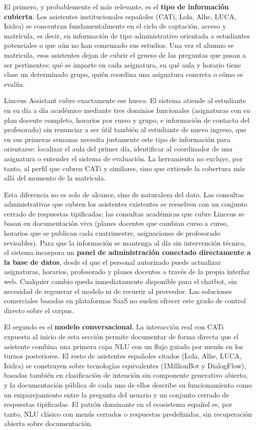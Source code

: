 El primero, y probablemente el más relevante, es el \textbf{tipo de información cubierta}. Los asistentes institucionales españoles (CATi, Lola, Alhe, LUCA, Isidra) se concentran fundamentalmente en el ciclo de captación, acceso y matrícula, es decir, en información de tipo administrativo orientada a estudiantes potenciales o que aún no han comenzado sus estudios. Una vez el alumno se matricula, esos asistentes dejan de cubrir el grueso de las preguntas que pasan a ser pertinentes: qué se imparte en cada asignatura, en qué aula y horario tiene clase un determinado grupo, quién coordina una asignatura concreta o cómo se evalúa.

Linceus Assistant cubre exactamente ese hueco. El sistema atiende al estudiante en su día a día académico mediante tres dominios funcionales (asignaturas con su plan docente completo, horarios por curso y grupo, e información de contacto del profesorado) sin renunciar a ser útil también al estudiante de nuevo ingreso, que en sus primeras semanas necesita justamente este tipo de información para orientarse: localizar el aula del primer día, identificar al coordinador de una asignatura o entender el sistema de evaluación. La herramienta no excluye, por tanto, al perfil que cubren CATi y similares, sino que extiende la cobertura más allá del momento de la matrícula.

Esta diferencia no es solo de alcance, sino de naturaleza del dato. Las consultas administrativas que cubren los asistentes existentes se resuelven con un conjunto cerrado de respuestas tipificadas; las consultas académicas que cubre Linceus se basan en documentación viva (planes docentes que cambian curso a curso, horarios que se publican cada cuatrimestre, asignaciones de profesorado revisables). Para que la información se mantenga al día sin intervención técnica, el sistema incorpora un \textbf{panel de administración conectado directamente a la base de datos}, desde el que el personal autorizado puede actualizar asignaturas, horarios, profesorado y planes docentes a través de la propia interfaz web. Cualquier cambio queda inmediatamente disponible para el chatbot, sin necesidad de regenerar el modelo ni de recurrir al proveedor. Las soluciones comerciales basadas en plataformas SaaS no suelen ofrecer este grado de control directo sobre el corpus.

El segundo es el \textbf{modelo conversacional}. La interacción real con CATi expuesta al inicio de esta sección permite documentar de forma directa que el asistente combina una primera capa NLU con un flujo guiado por menús en los turnos posteriores. El resto de asistentes españoles citados (Lola, Alhe, LUCA, Isidra) se construyen sobre tecnologías equivalentes (1MillionBot y DialogFlow), basadas también en clasificación de intención sin componente generativo abierto, y la documentación pública de cada uno de ellos describe su funcionamiento como un emparejamiento entre la pregunta del usuario y un conjunto cerrado de respuestas tipificadas. El patrón dominante en el ecosistema español es, por tanto, NLU clásico con menús cerrados o respuestas predefinidas, sin recuperación abierta sobre documentación.

